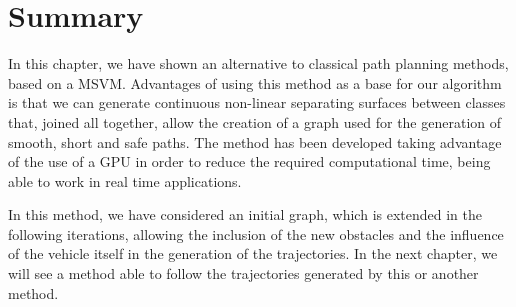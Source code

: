 \section{Summary}\label{ch:chapter06_03}

In this chapter, we have shown an alternative to classical path planning methods, based on a \acf{MSVM}. Advantages of using this method as a base for our algorithm is that we can generate continuous non-linear separating surfaces between classes that, joined all together, allow the creation of a graph used for the generation of smooth, short and safe paths.
The method has been developed taking advantage of the use of a \ac{GPU} in order to reduce the required computational time, being able to work in real time applications. 

In this method, we have considered an initial graph, which is extended in the following iterations, allowing the inclusion of the new obstacles and the influence of the vehicle itself in the generation of the trajectories. In the next chapter, we will see a method able to follow the trajectories generated by this or another method.